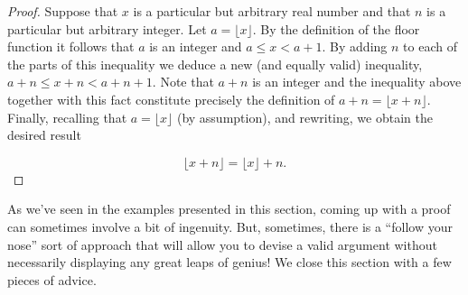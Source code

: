 \begin{proof}
Suppose that $x$ is a particular but arbitrary real number 
and that $n$ is a particular but arbitrary integer.  Let 
$a = \lfloor x \rfloor$.  By the definition of the floor function 
it follows that $a$ is an integer and $a \leq x < a+1$.  By adding 
$n$ to each of the parts of this inequality
we deduce a new (and equally valid) inequality, $a+n \leq x+n < a+n+1$.
Note that $a+n$ is an integer and the inequality above together with
this fact constitute precisely the definition of 
$a + n = \lfloor x + n \rfloor$.  Finally, recalling that 
$a = \lfloor x \rfloor$ (by assumption), and rewriting, we obtain the
desired result

\[ \lfloor x + n \rfloor = \lfloor x \rfloor + n. \]

\end{proof} 

As we've seen in the examples presented in this section, coming up
with a proof can sometimes involve a bit of ingenuity. But, sometimes, 
there is a ``follow your nose'' sort of approach that will
allow you to devise a valid argument without necessarily displaying
any great leaps of genius!  We close this section with a few pieces
of advice.

